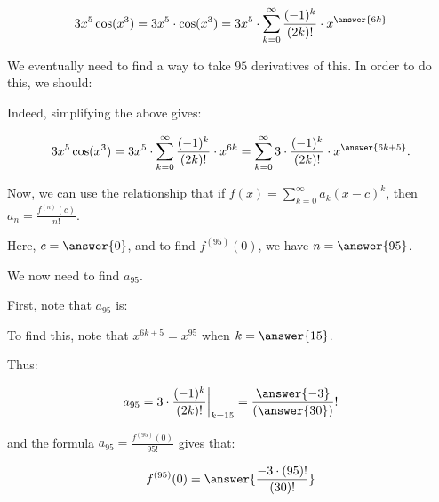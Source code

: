 \documentclass{ximera}
\begin{document}
\begin{exercise}
\begin{hint}
\begin{question}
\[
3x^5 \cos(x^3) = 3x^5 \cdot \cos(x^3) = 3x^5 \cdot   \sum_{k=0}^{\infty} \frac{(-1)^k}{(2k)!} \cdot x^{\answer{6k}}
\]

We eventually need to find a way to take $95$ derivatives of this.  In order to do this, we should:
\begin{selectAll}
\end{selectAll}

Indeed, simplifying the above gives:

\[
3x^5 \cos(x^3) = 3x^5 \cdot  \sum_{k=0}^{\infty} \frac{(-1)^k}{(2k)!} \cdot x^{6k} =  \sum_{k=0}^{\infty} 3 \cdot \frac{(-1)^k}{(2k)!} \cdot x^{\answer{6k+5}}.
\]


\begin{question}
Now, we can use the relationship that if $f(x) = \sum_{k=0}^{\infty} a_k(x-c)^k$, then $a_n = \frac{f^{(n)}(c)}{n!}$.

Here, $c= \answer{0}$, and to find $f^{(95)}(0)$, we have $n=\answer{95}$. 

We now need to find $a_{95}$.

\begin{question}
First, note that $a_{95}$ is:
\begin{multipleChoice}
\end{multipleChoice}

To find this, note that $x^{6k+5} = x^{95}$ when $k=\answer{15}$.  

\begin{question}
Thus:

\[
a_{95} = 3 \cdot \frac{(-1)^k}{(2k)!}  \bigg|_{k=15} = \frac{\answer{-3}}{(\answer{30})}!
\]

and the formula $a_{95} = \frac{f^{(95)}(0)}{95!}$ gives that:

\[
f^{(95)}(0) = \answer{\frac{-3 \cdot (95)!}{(30)!}}
\]
\end{question}


\end{question}

\end{question}

\end{question}
\end{hint}
\end{exercise}
\end{document}

